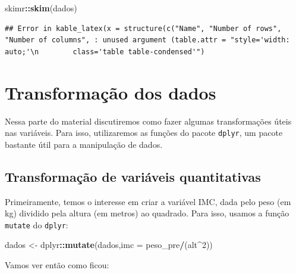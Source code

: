 \documentclass[
]{book}
\newenvironment{Shaded}{\begin{snugshade}}{\end{snugshade}}
\newcommand{\CommentTok}[1]{\textcolor[rgb]{0.56,0.35,0.01}{\textit{#1}}}
\newcommand{\DataTypeTok}[1]{\textcolor[rgb]{0.13,0.29,0.53}{#1}}
\newcommand{\DecValTok}[1]{\textcolor[rgb]{0.00,0.00,0.81}{#1}}
\newcommand{\KeywordTok}[1]{\textcolor[rgb]{0.13,0.29,0.53}{\textbf{#1}}}
\newcommand{\NormalTok}[1]{#1}
\newcommand{\OperatorTok}[1]{\textcolor[rgb]{0.81,0.36,0.00}{\textbf{#1}}}
\newcommand{\StringTok}[1]{\textcolor[rgb]{0.31,0.60,0.02}{#1}}
\begin{document}
\begin{Shaded}
\begin{Highlighting}[]
\NormalTok{skimr}\OperatorTok{::}\KeywordTok{skim}\NormalTok{(dados)}
\end{Highlighting}
\end{Shaded}

\begin{verbatim}
## Error in kable_latex(x = structure(c("Name", "Number of rows", "Number of columns", : unused argument (table.attr = "style='width: auto;'\n        class='table table-condensed'")
\end{verbatim}

\hypertarget{transformauxe7uxe3o-dos-dados}{%
\section{Transformação dos dados}\label{transformauxe7uxe3o-dos-dados}}

Nessa parte do material discutiremos como fazer algumas transformações úteis nas variáveis. Para isso, utilizaremos as funções do pacote \texttt{dplyr}, um pacote bastante útil para a manipulação de dados.

\hypertarget{transformauxe7uxe3o-de-variuxe1veis-quantitativas}{%
\subsection{Transformação de variáveis quantitativas}\label{transformauxe7uxe3o-de-variuxe1veis-quantitativas}}

Primeiramente, temos o interesse em criar a variável IMC, dada pelo peso (em kg) dividido pela altura (em metros) ao quadrado. Para isso, usamos a função \texttt{mutate} do \texttt{dplyr}:

\begin{Shaded}
\begin{Highlighting}[]
\NormalTok{dados <-}\StringTok{ }\NormalTok{dplyr}\OperatorTok{::}\KeywordTok{mutate}\NormalTok{(dados,}\DataTypeTok{imc =}\NormalTok{ peso_pre}\OperatorTok{/}\NormalTok{(alt}\OperatorTok{^}\DecValTok{2}\NormalTok{))}
\end{Highlighting}
\end{Shaded}

Vamos ver então como ficou:

\begin{Shaded}
\end{Shaded}
\end{document}
